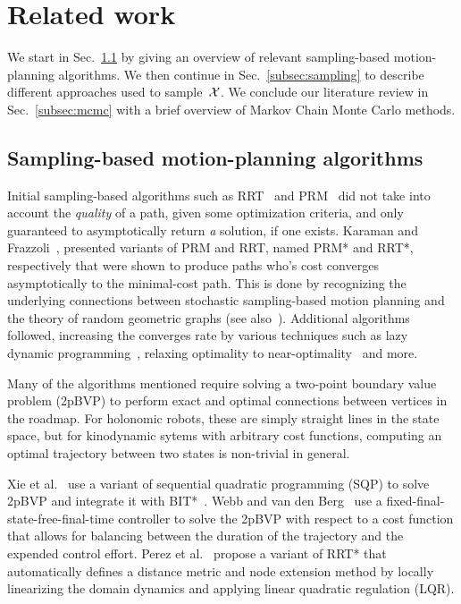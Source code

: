 \documentclass[letterpaper, 10 pt, conference]{ieeeconf}  %
\begin{document}
\section{Related work}
\label{sec:related_work}
We start in Sec.~\ref{subsec:planning} by giving an overview of relevant sampling-based motion-planning algorithms.
We then continue in Sec.~\ref{subsec:sampling} to describe different approaches used to sample~$\mathcal{X}$.
We conclude our literature review in Sec.~\ref{subsec:mcmc} with a brief overview of Markov Chain Monte Carlo methods.

\subsection{Sampling-based motion-planning algorithms}
\label{subsec:planning}
Initial sampling-based algorithms such as RRT~\cite{LK01} and PRM~\cite{KSLO96} did not take into account the \emph{quality} of a path, given some optimization criteria, and only guaranteed to asymptotically return \emph{a} solution, if one exists.
Karaman and Frazzoli~\cite{KF11}, presented variants of PRM and RRT, named PRM* and RRT*, respectively that were shown to produce paths who's cost converges asymptotically to the minimal-cost path.
This is done by recognizing the underlying connections between stochastic sampling-based motion planning and the theory of random geometric graphs (see also~\cite{SSH16}).
Additional algorithms followed, increasing the converges rate by various techniques such as lazy dynamic programming~\cite{GSB15, JSCP15}, relaxing optimality to near-optimality~\cite{DB14, SH16} and more.


Many of the algorithms mentioned require solving a two-point boundary value problem (2pBVP) to perform exact and optimal connections between vertices in the roadmap.
For holonomic robots, these are simply straight lines in the state space, but for kinodynamic sytems with arbitrary cost functions,  computing an optimal trajectory between two states is non-trivial in general.

Xie et al.~\cite{XBPA15} use a variant of sequential quadratic programming (SQP) to solve 2pBVP and integrate it with BIT*~\cite{GSB15}.
Webb and van den Berg~\cite{WB13} use a fixed-final-state-free-final-time controller to solve the 2pBVP  with respect to a cost function that allows for balancing between the duration of the trajectory and the expended control effort.
Perez et al.~\cite{PPKKL12} propose a variant of RRT* that automatically defines a distance metric and node extension method by locally linearizing
the domain dynamics and applying linear quadratic regulation (LQR).
\end{document}

